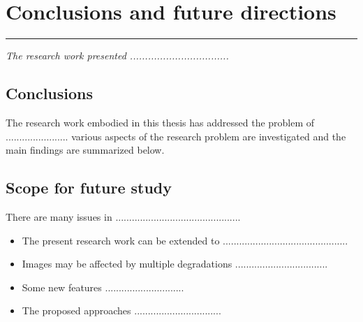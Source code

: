 \chapter{Conclusions and future directions}
\label{C7} %
\noindent\rule{\linewidth}{2pt}
\textit{The research work presented .................................}
\section{Conclusions}
The research work embodied in this thesis has addressed the problem of .......................
various aspects of the research problem are investigated and the main findings are summarized below.

\section{Scope for future study}
There are many issues in ..............................................
\begin{itemize}
	\item The present research work can be extended to ..............................................
	\item Images may be affected by multiple degradations ..................................
	\item Some new features .............................
	\item The proposed approaches ................................
	
\end{itemize}


